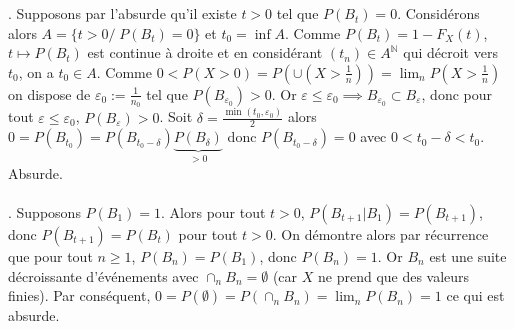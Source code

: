 \documentclass{report}
\begin{document}
\subsection{} \noindent{}\\ 
\\ 
\\
. Supposons par l'absurde qu'il existe $t>0$ tel que $P(B_t)=0$. Considérons alors $A=\{t>0/\; P(B_t)=0\}$ et $t_0=\inf A$. Comme $P(B_t)=1-F_X(t)$, $t\mapsto P(B_t)$ est continue à droite et en considérant $(t_n)\in A^{\mathbb N}$ qui décroit vers $t_0$, on a $t_0\in A$. Comme $0<P(X>0)=P(\cup (X>\frac 1n))=\lim_n P(X>\frac 1n)$ on dispose de $\varepsilon_0:=\frac{1}{n_0}$ tel que $P(B_{\varepsilon_0})>0$. Or $\varepsilon\leq \varepsilon_0 \implies B_{\varepsilon_0}\subset B_{\varepsilon}$, donc pour tout $\varepsilon\leq \varepsilon_0$, $P(B_{\varepsilon})>0$. Soit $\delta = \frac{\min(t_0,\varepsilon_0)}{2}$ alors $0=P(B_{t_0})=P(B_{t_0-\delta})\underbrace{P(B_{\delta})}_{>0}$ donc $P(B_{t_0-\delta})=0$ avec $0<t_0-\delta<t_0$. Absurde.
\\ \\
. Supposons $P(B_1)=1$. Alors pour tout $t>0$, $P(B_{t+1}|B_1)=P(B_{t+1})$, donc $P(B_{t+1})=P(B_{t})$ pour tout $t>0$. On démontre alors par récurrence que pour tout $n\geq 1$, $P(B_n)=P(B_1)$, donc $P(B_n)=1$. Or $B_n$ est une suite décroissante d'événements avec $\cap_n B_n =\emptyset$ (car $X$ ne prend que des valeurs finies). Par conséquent, $0=P(\emptyset)=P(\cap_n B_n)=\lim_n P(B_n)= 1$ ce qui est absurde. \\ \\
\end{document}
